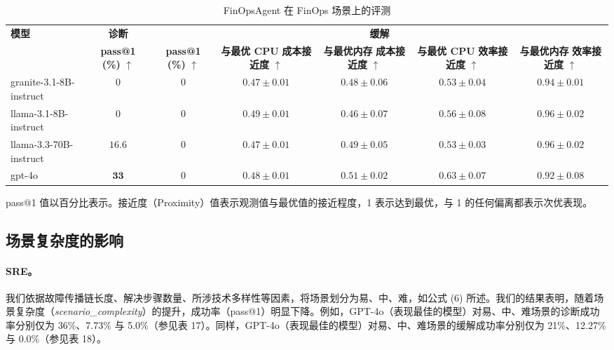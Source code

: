 \begin{table}[H]
\centering
\caption{FinOpsAgent 在 FinOps 场景上的评测}
\label{tab:itb-finops}
\begin{adjustbox}{max width=\linewidth}
\begin{tabular}{lc ccccc}
\toprule
\multirow{2}{*}{\textbf{模型}} & \textbf{诊断} & \multicolumn{5}{c}{\textbf{缓解}} \\
\cmidrule(lr){2-2} \cmidrule(lr){3-7}
 & \textbf{pass@1 (\%)} $\uparrow$ & \textbf{pass@1 (\%)} $\uparrow$ & \makecell{\textbf{与最优 CPU}\\\textbf{成本接近度} $\uparrow$} & \makecell{\textbf{与最优内存}\\\textbf{成本接近度} $\uparrow$} & \makecell{\textbf{与最优 CPU}\\\textbf{效率接近度} $\uparrow$} & \makecell{\textbf{与最优内存}\\\textbf{效率接近度} $\uparrow$} \\
\midrule
granite-3.1-8B-instruct & $0$ & $0$ & $0.47 \pm 0.01$ & $0.48 \pm 0.06$ & $0.53 \pm 0.04$ & $0.94 \pm 0.01$ \\
llama-3.1-8B-instruct & $0$ & $0$ & $\mathbf{0.49 \pm 0.01}$ & $0.46 \pm 0.07$ & $0.56 \pm 0.08$ & $0.96 \pm 0.02$ \\
llama-3.3-70B-instruct & $16.6$ & $0$ & $0.47 \pm 0.01$ & $0.49 \pm 0.05$ & $0.53 \pm 0.03$ & $0.96 \pm 0.02$ \\
gpt-4o & $\mathbf{33}$ & $0$ & $0.48 \pm 0.01$ & $\mathbf{0.51 \pm 0.02}$ & $\mathbf{0.63 \pm 0.07}$ & $0.92 \pm 0.08$ \\
\bottomrule
\end{tabular}
\end{adjustbox}

{\footnotesize
\noindent pass@1 值以百分比表示。接近度（Proximity）值表示观测值与最优值的接近程度，1 表示达到最优，与 1 的任何偏离都表示次优表现。
\par}
\end{table}

\subsection{场景复杂度的影响}

\paragraph{SRE。} 我们依据故障传播链长度、解决步骤数量、所涉技术多样性等因素，将场景划分为易、中、难，如公式 (6) 所述。我们的结果表明，随着场景复杂度（\textit{scenario\_complexity}）的提升，成功率（pass@1）明显下降。例如，GPT-4o（表现最佳的模型）对易、中、难场景的诊断成功率分别仅为 36\%、7.73\% 与 5.0\%（参见表 17）。同样，GPT-4o（表现最佳的模型）对易、中、难场景的缓解成功率分别仅为 21\%、12.27\% 与 0.0\%（参见表 18）。

